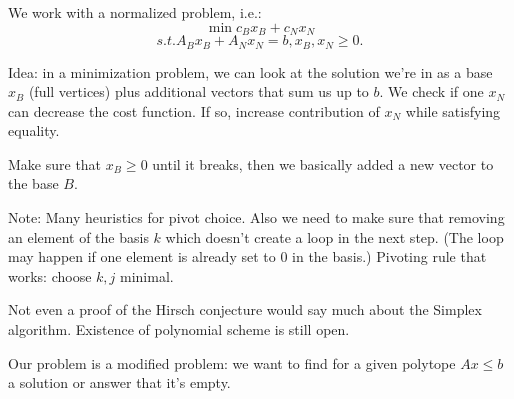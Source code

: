 





We work with a normalized problem, i.e.:
$$ \min c_B x_B + c_N x_N $$
\vcorr
$$ s.t. A_B x_B + A_N x_N = b, x_B, x_N ≥ 0.$$

Idea: in a minimization problem, we can look at the solution we're in
as a base $x_B$ (full vertices) plus additional vectors that sum us up
to $b$. We check if one $x_N$ can decrease the cost function. If so,
increase contribution of $x_N$ while satisfying equality.

Make sure that $x_B ≥ 0$ until it breaks, then we basically
added a new vector to the base $B$. 

Note: Many heuristics for pivot choice. Also we need to make sure that
removing an element of the basis $k$ which doesn't create a loop in
the next step.  (The loop may happen if one element is already set to
$0$ in the basis.) Pivoting rule that works: choose $k,j$ minimal.


Not even a proof of the Hirsch conjecture would say much about the Simplex
algorithm. Existence of polynomial scheme is still open.


Our problem is a modified problem: we want to find for a given polytope
$Ax \leq b$ a solution or answer that it's empty.



